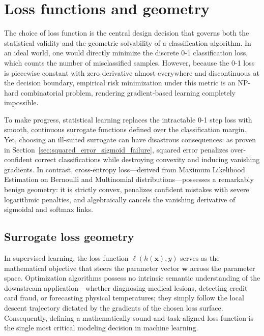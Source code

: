 \section{Loss functions and geometry}
\label{sec:loss_geometry_and_cross_entropy}

The choice of loss function is the central design decision that governs both the statistical validity and the geometric solvability of a classification algorithm. In an ideal world, one would directly minimize the discrete 0-1 classification loss, which counts the number of misclassified samples. However, because the 0-1 loss is piecewise constant with zero derivative almost everywhere and discontinuous at the decision boundary, empirical risk minimization under this metric is an NP-hard combinatorial problem, rendering gradient-based learning completely impossible.

To make progress, statistical learning replaces the intractable 0-1 step loss with smooth, continuous surrogate functions defined over the classification margin. Yet, choosing an ill-suited surrogate can have disastrous consequences: as proven in Section~\ref{sec:squared_error_sigmoid_failure}, squared error penalizes over-confident correct classifications while destroying convexity and inducing vanishing gradients. In contrast, cross-entropy loss---derived from Maximum Likelihood Estimation on Bernoulli and Multinomial distributions---possesses a remarkably benign geometry: it is strictly convex, penalizes confident mistakes with severe logarithmic penalties, and algebraically cancels the vanishing derivative of sigmoidal and softmax links.

\subsection{Surrogate loss geometry}
\label{sec:loss_comparison_review}

In supervised learning, the loss function $\ell(h(\mathbf{x}), y)$ serves as the mathematical objective that steers the parameter vector $\mathbf{w}$ across the parameter space. Optimization algorithms possess no intrinsic semantic understanding of the downstream application---whether diagnosing medical lesions, detecting credit card fraud, or forecasting physical temperatures; they simply follow the local descent trajectory dictated by the gradients of the chosen loss surface. Consequently, defining a mathematically sound and task-aligned loss function is the single most critical modeling decision in machine learning.

